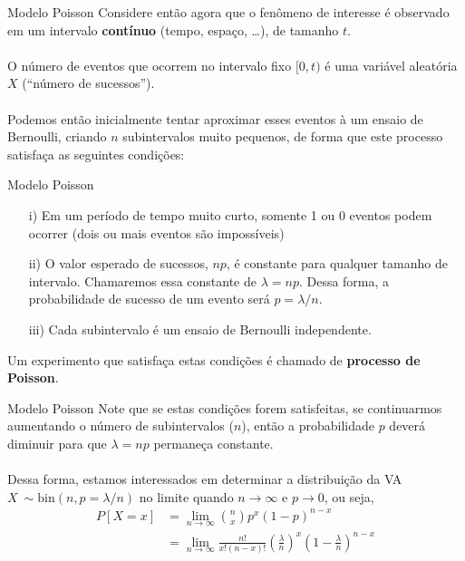 \documentclass[10pt]{beamer}\usepackage[]{graphicx}\usepackage[]{color}
\theoremstyle{definition}
\begin{document}
\begin{frame}[fragile]{Modelo Poisson}
  Considere então agora que o fenômeno de interesse é observado em um
  intervalo \textbf{contínuo} (tempo, espaço, \ldots), de tamanho $t$.
  \\~\\
  O número de eventos que ocorrem no intervalo fixo $[0,t)$ é uma
  variável aleatória $X$ (``número de sucessos''). \\~\\
  Podemos então inicialmente tentar aproximar esses eventos à um ensaio
  de Bernoulli, criando $n$ subintervalos muito pequenos, de forma que
  este processo satisfaça as seguintes condições:
\end{frame}

\begin{frame}[fragile]{Modelo Poisson}
  \begin{enumerate}
  \item[i)] Em um período de tempo muito curto, somente 1 ou 0 eventos
    podem ocorrer (dois ou mais eventos são impossíveis)
  \item[ii)] O valor esperado de sucessos, $np$, é constante para
    qualquer tamanho de intervalo. Chamaremos essa constante de $\lambda
    = np$. Dessa forma, a probabilidade de sucesso de um evento será $p
    = \lambda/n$.
  \item[iii)] Cada subintervalo é um ensaio de Bernoulli independente.
  \end{enumerate}
  \vspace{1em}
  Um experimento que satisfaça estas condições é chamado de
  \textbf{processo de Poisson}.
\end{frame}

\begin{frame}[fragile]{Modelo Poisson}
  Note que se estas condições forem satisfeitas, se continuarmos
  aumentando o número de subintervalos ($n$), então a probabilidade $p$
  deverá diminuir para que $\lambda = np$ permaneça constante. \\~\\
  Dessa forma, estamos interessados em determinar a distribuição da VA
  $X ~ \sim \text{bin}(n, p = \lambda/n)$ no limite quando $n \to
  \infty$ e $p \to 0$, ou seja,
  \begin{align*}
    P[X = x] &= \lim_{n \to \infty} \binom{n}{x} p^x (1-p)^{n-x} \\
     &= \lim_{n \to \infty} \frac{n!}{x!(n-x)!} \left( \frac{\lambda}{n} \right)^x
       \left( 1 - \frac{\lambda}{n}  \right)^{n-x}
  \end{align*}
\end{frame}
\end{document}
